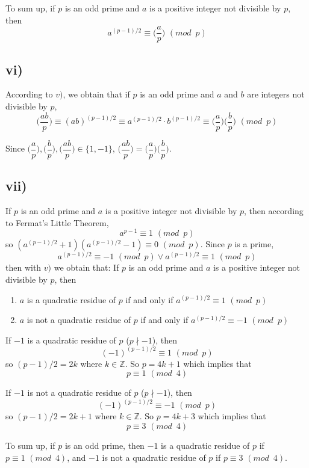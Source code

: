 \documentclass[a4paper,12pt,titlepage]{article}
\begin{document}
To sum up, if $p$ is an odd prime and $a$ is a positive integer not divisible by $p$, then
$$a^{(p-1)/2}\equiv \Big(\dfrac{a}{p}\Big)\,\,(mod\,\,\,p)$$

\subsection*{vi)}
According to $v)$, we obtain that if $p$ is an odd prime and $a$ and $b$ are integers not divisible by $p$,
 $$\Big(\dfrac{ab}{p}\Big)\equiv(ab)^{(p-1)/2}\equiv a^{(p-1)/2}\cdot b^{(p-1)/2}\equiv \Big(\dfrac{a}{p}\Big)\Big(\dfrac{b}{p}\Big)\,\,(mod\,\,\,p)$$

Since $\Big(\dfrac{a}{p}\Big),\Big(\dfrac{b}{p}\Big),\Big(\dfrac{ab}{p}\Big)\in\lbrace1,-1\rbrace$, $\Big(\dfrac{ab}{p}\Big)= \Big(\dfrac{a}{p}\Big)\Big(\dfrac{b}{p}\Big)$.

\subsection*{vii)}
If $p$ is an odd prime and $a$ is a positive integer not divisible by $p$, then according to Fermat's Little Theorem,
$$a^{p-1}\equiv1\,\,(mod\,\,\,p)$$
so $(a^{(p-1)/2}+1)(a^{(p-1)/2}-1)\equiv0\,\,(mod\,\,\,p)$. Since $p$ is a prime,
$$a^{(p-1)/2}\equiv-1\,\,(mod\,\,\,p)\vee a^{(p-1)/2}\equiv1\,\,(mod\,\,\,p)$$
then with $v)$ we obtain that: If $p$ is an odd prime and $a$ is a positive integer not divisible by $p$, then
\begin{enumerate}
\item $a$ is a quadratic residue of $p$ if and only if $a^{(p-1)/2}\equiv1\,\,(mod\,\,\,p)$
\item $a$ is not a quadratic residue of $p$ if and only if $a^{(p-1)/2}\equiv-1\,\,(mod\,\,\,p)$
\end{enumerate}

If $-1$ is a quadratic residue of $p$ ($p\nmid-1$), then
$$(-1)^{(p-1)/2}\equiv 1\,\,(mod\,\,\,p)$$
so $(p-1)/2=2k$ where $k\in\mathbb{Z}$. So $p=4k+1$ which implies that 
$$p\equiv1\,\,(mod\,\,\,4)$$ 

If $-1$ is not a quadratic residue of $p$ ($p\nmid-1$), then
$$(-1)^{(p-1)/2}\equiv -1\,\,(mod\,\,\,p)$$
so $(p-1)/2=2k+1$ where $k\in\mathbb{Z}$. So $p=4k+3$ which implies that 
$$p\equiv3\,\,(mod\,\,\,4)$$ 

To sum up, if $p$ is an odd prime, then  $-1$ is a quadratic residue of $p$ if $p\equiv1\,\,(mod\,\,\,4)$, and $-1$ is not a quadratic residue of $p$ if $p\equiv3\,\,(mod\,\,\,4)$.
\end{document}
